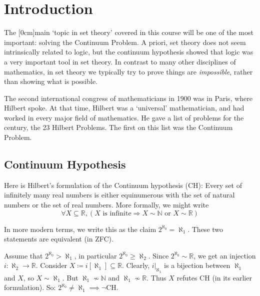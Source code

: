 \documentclass{article}
\begin{document}
\maketitle

\tableofcontents

\clearpage
\section{Introduction}
The [0cm]main `topic in set theory' covered in this course will be one of the most important: solving the Continuum Problem.
A priori, set theory does not seem intrinsically related to logic, but the continuum hypothesis showed that logic was a very important tool in set theory.
In contrast to many other disciplines of mathematics, in set theory we typically try to prove things are \emph{impossible}, rather than showing what is possible.

The second international congress of mathematicians in 1900 was in Paris, where Hilbert spoke. At that time, Hilbert was a `universal' mathematician, and had worked in every major field of mathematics. He gave a list of problems for the century, the 23 Hilbert Problems. The first on this list was the Continuum Problem.

\subsection{Continuum Hypothesis}
Here is Hilbert's formulation of the Continuum hypothesis (CH):
Every set of infinitely many real numbers is either equinumerous with the set of natural numbers or the set of real numbers.
More formally, we might write
\begin{equation*}
  \forall X \subseteq \mathbb{R}, (X \text{ is infinite} \Rightarrow X \sim \mathbb{N} \text{ or } X \sim \mathbb{R})
\end{equation*}

In more modern terms, we write this as the claim $2^{\aleph_0} = \aleph_1$.
These two statements are equivalent (in ZFC).

Assume that $2^{\aleph_0} > \aleph_1$, in particular $2^{\aleph_0} \geq \aleph_2$. Since $2^{\aleph_0} \sim \mathbb{R}$, we get an injection $i: \aleph_2 \to \mathbb{R}$.
Consider $X \coloneqq i[\aleph_1] \subseteq \mathbb{R}$. Clearly, $i|_{\aleph_1}$ is a bijection between $\aleph_1$ and $X$, so $X \sim \aleph_1$.
But $\aleph_1 \nsim \mathbb{N}$ and $\aleph_1 \nsim \mathbb{R}$.
Thus $X$ refutes CH (in its earlier formulation).
So: $2^{\aleph_0} \neq \aleph_1 \implies \neg \text{CH}$.
\end{document}
